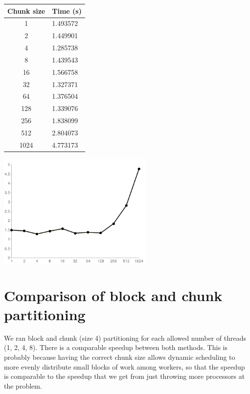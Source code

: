 \documentclass{article}[12pt;letterpaper]
\begin{document}
\begin{center}\begin{tabular}{c l}
Chunk size & Time (s) \\
\hline{}
   1 & 1.493572 \\
   2 & 1.449901 \\
   4 & 1.285738 \\
   8 & 1.439543 \\
  16 & 1.566758 \\
  32 & 1.327371 \\
  64 & 1.376504 \\
 128 & 1.339076 \\
 256 & 1.838099 \\
 512 & 2.804073 \\
1024 & 4.773173
\end{tabular}

\includegraphics[width=3in]{a2_sec2_2.png}
\end{center}

\section{Comparison of block and chunk partitioning}

We ran block and chunk (size 4) partitioning for each allowed number of threads
(1, 2, 4, 8). There is a comparable speedup between both methods. This is
probably because having the correct chunk size allows dynamic scheduling to
more evenly distribute small blocks of work among workers, so that the speedup
is comparable to the speedup that we get from just throwing more processors at
the problem.
\end{document}
